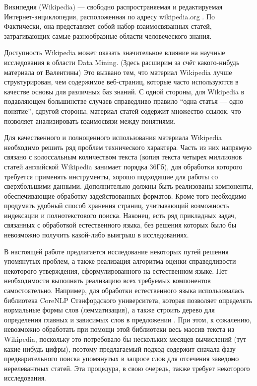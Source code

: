 Википедия (Wikipedia) --- свободно распространяемая и редактируемая 
Интернет-энциклопедия, расположенная по адресу wikipedia.org \cite{wikipedia}. По 
Фактически, она представляет собой набор взаимосвязанных статей, затрагивающих самые 
разнообразные области человеческого знания. 

Доступность Wikipedia может оказать значительное влияние на научные
исследования в области Data Mining. (Здесь расширим за счёт
какого-нибудь материала от Валентины) Это вызвано тем, что материал
Wikipedia лучше структурирован, чем содержимое веб-страниц, которые
часто используются в качестве основы для различных баз знаний. С одной
стороны, для Wikipedia в подавляющем большинстве случаев справедливо
правило ``одна статья --- одно понятие'', сдругой стороны, материал
статей содержит множество ссылок, что позволяет анализировать
взаимосвязи между понятиями. 

Для качественного и полноценного использования материала Wikipedia
необходимо решить ряд проблем технического характера. Часть из них
напрямую связано с колоссальным количеством текста (копия текста четырех 
миллионов статей английской Wikipedia занимает порядка 36Гб), 
для обработки которого требуется применять инструменты, хорошо
подходящие для работы со сверхбольшими данными. Дополнительно должны быть
реализованы компоненты, обеспечивающие обработку задействованных форматов. Кроме того 
необходимо продумать удобный способ хранения страниц, учитывающий 
возможность индексации и полнотекстового поиска. Наконец, есть ряд 
прикладных задач, связанных с обработкой естественного языка, без решения 
которых было бы невозможно получить какой-либо выигрыш в исследованиях.

В настоящей работе предлагается исследование некоторых путей решения
 упомянутых проблем, а также реализация алгоритма оценки
 справедливости некоторого утверждения, сформулированного на
 естественном языке.  Нет необходимости выполнять реализацию всех
 требуемых компонентов самостоятельно. Например, для обработки
 естественного языка использовалась библиотека CoreNLP Стэнфордского
 университета, которая позволяет определять нормальные формы слов
 (лемматизация), а также строить дерево для определения главных и
 зависимых слов в предложении \cite{corenlp}. При этом, к сожалению, невозможно
 обработать при помощи этой библиотеки весь массив текста из
 Wikipedia, поскольку это потребовало бы нескольких месяцев вычислений
 (тут какие-нибудь цифры), поэтому предлагаемый подход содержит
 сначала фазу предварительного поиска упомянутых в запросе слов для
 отсечения заведомо нерелевантных статей. Эта процедура, в свою
 очередь, также требует некоторого исследования.


